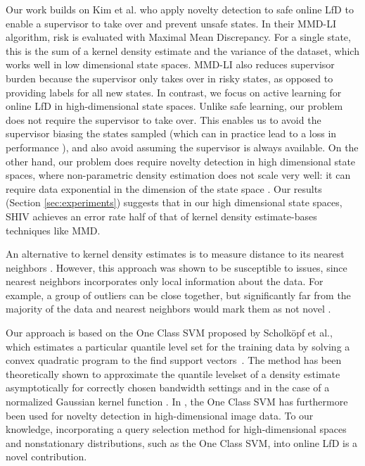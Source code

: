 \documentclass[10pt, conference]{ieeeconf}      %
\begin{document}
Our work builds on Kim et al. \cite{kim2013maximum} who apply novelty detection to safe online LfD to enable a supervisor to take over and prevent unsafe states.  In their MMD-LI algorithm, risk is evaluated with Maximal Mean Discrepancy. For a single state, this is the sum of a kernel density estimate and the variance of the dataset, which works well in low dimensional state spaces.  MMD-LI also reduces supervisor burden because the supervisor only takes over in risky states, as opposed to providing labels for all new states. 
In contrast, we focus on active learning for online LfD in high-dimensional state spaces. Unlike safe learning, our problem does not require the supervisor to take over. This enables us to avoid the supervisor biasing the states sampled (which can in practice lead to a loss in performance \cite{ross2010reduction}), and also avoid assuming the supervisor is always available. On the other hand, our problem does require novelty detection in high dimensional state spaces, where non-parametric density estimation does not scale very well: it can require data exponential in the dimension of the state space \cite{nadaraya1964estimating}. Our results (Section \ref{sec:experiments}) suggests that in our high dimensional state spaces, SHIV achieves an error rate half of that of kernel density estimate-bases techniques like MMD.

An alternative to kernel density estimates is to measure distance to its nearest neighbors \cite{knox1998algorithms}. However, this approach was shown to be
susceptible to issues, since nearest neighbors  incorporates only local information about the data. For example, a group of outliers can be close together, but significantly far from the majority of the data and nearest neighbors would mark them as not novel \cite{hodge2004survey}.

Our approach is based on the One Class SVM proposed by Scholk{\"o}pf et al., which estimates a particular quantile level set for the training data by solving a convex quadratic program  to the find support
vectors~\cite{scholkopf2001estimating}. The method has been theoretically shown to approximate the quantile levelset of a density estimate
asymptotically for correctly chosen bandwidth settings and in the case of a normalized Gaussian kernel function \cite{vert2006consistency}. 
In \cite{liu2014unsupervised}, the One Class SVM has furthermore been used for novelty detection in high-dimensional image data. To our knowledge, incorporating a query selection method for high-dimensional spaces and nonstationary distributions, such as the One Class SVM, into online LfD is a novel contribution.
\end{document}
